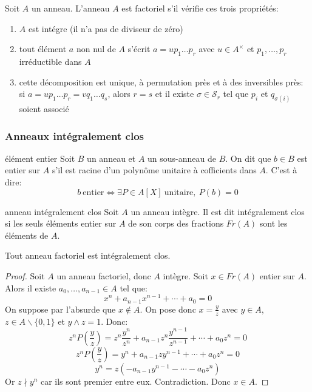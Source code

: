 \begin{definition}{}{}
    Soit $A$ un anneau. L'anneau $A$ est factoriel s'il vérifie ces trois propriétés:
    \begin{enumerate}[(1)]
        \item $A$ est intégre (il n'a pas de diviseur de zéro)
        \item tout élément $a$ non nul de $A$ s'écrit $a = u p_1 \dots p_r$ avec $u \in A^\times$
              et $p_1, \dots, p_r$ irréductible dans $A$
        \item cette décomposition est unique, à permutation près et à des inversibles près:
              si $a = u p_1 \dots p_r = v q_1 \dots q_s$, alors $r = s$ 
              et il existe $\sigma \in \mathscr{S}_r$ tel que $p_i$ et $q_{\sigma(i)}$ soient associé
    \end{enumerate}
\end{definition}




\subsubsection{Anneaux intégralement clos}

\begin{definition}{élément entier}{}
    Soit $B$ un anneau et $A$ un sous-anneau de $B$. On dit que $b \in B$ est entier sur $A$ s'il est racine d'un polynôme unitaire à cofficients dans $A$.
    C'est à dire:
    \[ b ~ \text{entier} \Longleftrightarrow \exists P \in A[X] ~ \text{unitaire}, ~ P(b) = 0 \]
\end{definition}

\begin{proposition}{anneau intégralement clos}{}
    Soit $A$ un anneau intègre. Il est dit intégralement clos si les seuls éléments entier sur $A$ de son corps des fractions $Fr(A)$ sont les éléments de $A$.
\end{proposition}

\begin{proposition}{}{}
    Tout anneau factoriel est intégralement clos.
\end{proposition}

\begin{proof}
    Soit $A$ un anneau factoriel, donc $A$ intègre. \newline
    Soit $x \in Fr(A)$ entier sur $A$. Alors il existe $a_0, \dots, a_{n-1} \in A$ tel que: 
    \[x^n + a_{n-1}x^{n-1} + \cdots + a_0 = 0\]
    On suppose par l'absurde que $x \notin A$. \newline
    On pose donc $x = \frac{y}{z}$ avec $y \in A$, $z \in A \backslash \{0,1\}$ et $y \wedge z = 1$.
    Donc:
    \[ z^n P(\frac{y}{z}) = z^n \frac{y^n}{z^n} + a_{n-1} z^n \frac{y^{n-1}}{z^{n-1}} + \cdots + a_0 z^n = 0 \]
    \[ z^n P(\frac{y}{z}) = y^n + a_{n-1} z y^{n-1} + \cdots + a_0 z^n = 0\]
    \[ y^n = z (- a_{n-1} y^{n-1} - \cdots - a_0 z^n) \]
    Or $z \nmid y^n$ car ils sont premier entre eux. Contradiction. Donc $x \in A$.
\end{proof}

